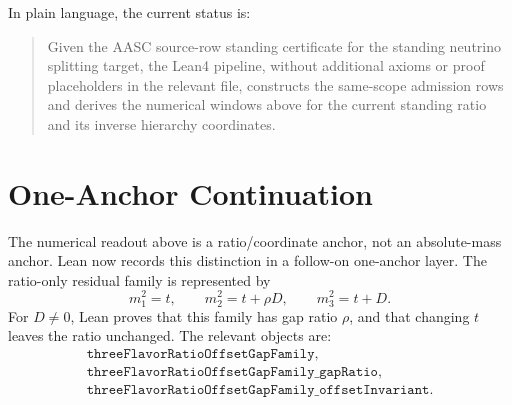 \documentclass[11pt]{article}
\begin{document}
In plain language, the current status is:
\begin{quote}
Given the AASC source-row standing certificate for the standing neutrino
splitting target, the Lean4 pipeline, without additional axioms or proof
placeholders in the relevant file, constructs the same-scope admission rows
and derives the numerical windows above for the current standing ratio and
its inverse hierarchy coordinates.
\end{quote}

\section{One-Anchor Continuation}

The numerical readout above is a ratio/coordinate anchor, not an absolute-mass
anchor.  Lean now records this distinction in a follow-on one-anchor layer.
The ratio-only residual family is represented by
\[
  m_1^2=t,\qquad
  m_2^2=t+\rho D,\qquad
  m_3^2=t+D.
\]
For \(D\neq 0\), Lean proves that this family has gap ratio \(\rho\), and
that changing \(t\) leaves the ratio unchanged.  The relevant objects are:
\[
\begin{array}{ll}
\texttt{threeFlavorRatioOffsetGapFamily},\\
\texttt{threeFlavorRatioOffsetGapFamily\_gapRatio},\\
\texttt{threeFlavorRatioOffsetGapFamily\_offsetInvariant}.
\end{array}
\]
\end{document}
